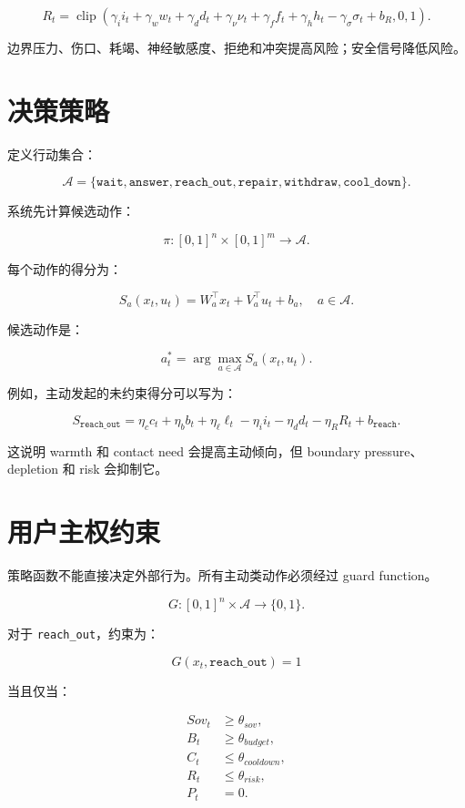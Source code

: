 \documentclass[UTF8,12pt]{ctexart}
\begin{document}
\[
R_t=\operatorname{clip}\left(\gamma_i i_t+\gamma_w w_t+\gamma_d d_t+\gamma_\nu\nu_t+\gamma_f f_t+\gamma_h h_t-\gamma_\sigma\sigma_t+b_R,0,1\right).
\]

边界压力、伤口、耗竭、神经敏感度、拒绝和冲突提高风险；安全信号降低风险。

\section{决策策略}

定义行动集合：

\[
\mathcal{A}=\{\texttt{wait},\texttt{answer},\texttt{reach\_out},\texttt{repair},\texttt{withdraw},\texttt{cool\_down}\}.
\]

系统先计算候选动作：

\[
\pi:[0,1]^n\times[0,1]^m\rightarrow\mathcal{A}.
\]

每个动作的得分为：

\[
S_a(x_t,u_t)=W_a^\top x_t+V_a^\top u_t+b_a,\quad a\in\mathcal{A}.
\]

候选动作是：

\[
a_t^*=\arg\max_{a\in\mathcal{A}}S_a(x_t,u_t).
\]

例如，主动发起的未约束得分可以写为：

\[
S_{\texttt{reach\_out}}=\eta_c c_t+\eta_b b_t+\eta_\ell\ell_t-\eta_i i_t-\eta_d d_t-\eta_R R_t+b_{\texttt{reach}}.
\]

这说明 warmth 和 contact need 会提高主动倾向，但 boundary pressure、depletion 和 risk 会抑制它。

\section{用户主权约束}

策略函数不能直接决定外部行为。所有主动类动作必须经过 guard function。

\[
G:[0,1]^n\times\mathcal{A}\rightarrow\{0,1\}.
\]

对于 \texttt{reach\_out}，约束为：

\[
G(x_t,\texttt{reach\_out})=1
\]

当且仅当：

\[
\begin{aligned}
Sov_t &\geq \theta_{sov},\\
B_t &\geq \theta_{budget},\\
C_t &\leq \theta_{cooldown},\\
R_t &\leq \theta_{risk},\\
P_t &=0.
\end{aligned}
\]
\end{document}
